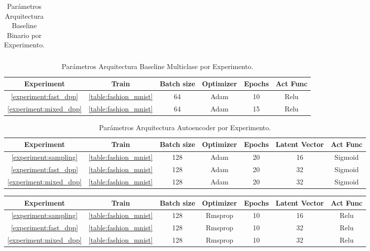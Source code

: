 \begin{appendixs}
\begin{table}[ht]
\begin{tabular}{|c|c|c|c|c|c|}
    \end{tabular}
    \caption{Parámetros Arquitectura Baseline Binario por Experimento.}
    \label{table:baseline2d_parameters}
    \end{table}
    
   \begin{table}[ht]
    \begin{tabular}{|c|c|c|c|c|c|}
    \hline
    Experiment & Train & Batch size & Optimizer & Epochs &  Act Func \\ \hline

    \ref{experiment:fast_dpp}      & \ref{table:fashion_mnist}    & 64        & Adam      & 10                & Relu         \\ \hline
    \ref{experiment:mixed_dpp}      & \ref{table:fashion_mnist}    & 64        & Adam      & 15                 & Relu         \\ \hline

    \end{tabular}
    \caption{Parámetros Arquitectura Baseline Multiclase por Experimento.}
    \label{table:conv_parameters}
    \end{table}
  
  \begin{table}[ht]
    \begin{tabular}{|c|c|c|c|c|c|c|}
    \hline
    Experiment & Train & Batch size & Optimizer & Epochs & Latent Vector & Act Func \\ \hline
    \ref{experiment:sampling}      & \ref{table:fashion_mnist}   & 128        & Adam      & 20     & 16                & Sigmoid         \\ \hline
    \ref{experiment:fast_dpp}      & \ref{table:fashion_mnist}    & 128        & Adam      & 20     & 32                & Sigmoid         \\ \hline
    \ref{experiment:mixed_dpp}      & \ref{table:fashion_mnist}    & 128        & Adam      & 20     & 32                & Sigmoid         \\ \hline
    \end{tabular}
    \caption{Parámetros Arquitectura Autoencoder por Experimento.}
    \label{table:autoencoder_parameters}
    \end{table}
  
  
  \begin{table}[ht]
    \begin{tabular}{|c|c|c|c|c|c|c|}
    \hline
    Experiment & Train & Batch size & Optimizer & Epochs & Latent Vector & Act Func \\ \hline
    \ref{experiment:sampling}      & \ref{table:fashion_mnist}    & 128        & Rmsprop      & 10     & 16                & Relu         \\ \hline
    \ref{experiment:fast_dpp}      & \ref{table:fashion_mnist}    & 128        & Rmsprop      & 10     & 32                & Relu         \\ \hline
    \ref{experiment:mixed_dpp}      & \ref{table:fashion_mnist}    & 128        & Rmsprop      & 10     & 32                & Relu         \\ \hline
    

\end{tabular}
\end{table}
\end{appendixs}

